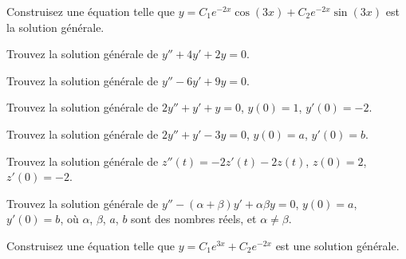\begin{exercise}
Construisez une équation telle que $y = C_1 e^{-2x} \cos(3x) + C_2 e^{-2x}
\sin(3x)$ est la solution générale.
\end{exercise}

\setcounter{exercise}{100}

\begin{exercise}
Trouvez la solution générale de
$y''+4y'+2y=0$.
\end{exercise}

\begin{exercise}
Trouvez la solution générale de
$y''-6y'+9y=0$.
\end{exercise}

\begin{exercise}
Trouvez la solution générale de
$2y''+y'+y=0$, $y(0) = 1$, $y'(0)=-2$.
\end{exercise}

\begin{exercise}
Trouvez la solution générale de
$2y''+y'-3y=0$, $y(0) = a$, $y'(0)=b$.
\end{exercise}

\begin{exercise}
Trouvez la solution générale de
$z''(t) = -2z'(t)-2z(t)$, $z(0) = 2$, $z'(0)= -2$.
\end{exercise}

\begin{exercise}
Trouvez la solution générale de
$y''-(\alpha+\beta) y' + \alpha \beta y=0$, $y(0) = a$, $y'(0)=b$,
où $\alpha$, $\beta$, $a$, $b$ sont des nombres réels, et $\alpha \not=
\beta$.
\end{exercise}

\begin{exercise}
Construisez une équation telle que  $y = C_1 e^{3x} + C_2 e^{-2x}$ est une solution générale.  
\end{exercise}


